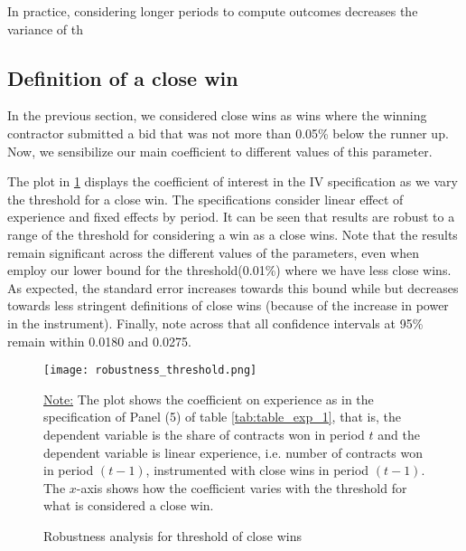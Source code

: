 In practice, considering longer periods to compute outcomes decreases the variance of th







\subsection{Definition of a close win}
In the previous section, we considered close wins as wins where the winning contractor submitted a bid that was not more than 0.05\% below the runner up. Now, we sensibilize our main coefficient to different values of this parameter.

 The plot in  \ref{fig:close_wins_robust} displays the coefficient of interest in the IV specification as we vary the threshold for a close win. The specifications consider linear effect of experience and fixed effects by period. It can be seen that results are robust to a range of the threshold for considering a win as a close wins. Note that the results remain significant across the different values of the parameters, even when  employ our lower bound for the threshold(0.01\%) where we have less close wins. As expected, the standard error increases towards this bound while but decreases towards  less stringent definitions of close wins (because of the increase in power in the instrument). Finally, note across that all confidence intervals at 95\% remain within 0.0180 and 0.0275.

 \begin{figure}[H]
         \centering
         \texttt{[image: robustness\_threshold.png]}
         \caption{Robustness analysis for threshold of close wins}
         \label{fig:close_wins_robust}

  \vskip 0.5mm
  {\justifying\footnotesize\underline{Note:} The plot shows the coefficient on experience as in the specification of Panel (5) of table \ref{tab:table_exp_1}, that is, the dependent variable is the share of contracts won in period $t$ and the dependent variable is linear experience, i.e. number of contracts won in period $(t-1)$, instrumented with close wins in period $(t-1)$. The $x$-axis shows how the coefficient varies with the threshold for what is considered a close win.\par}


     \end{figure}
